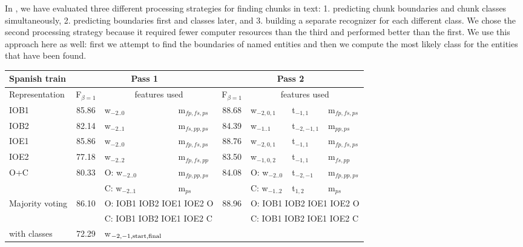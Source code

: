 \documentclass[11pt]{article}
\begin{document}
In \cite{tks2002jmlr}, we have evaluated three different processing
strategies for finding chunks in text: 1. predicting chunk boundaries
and chunk classes simultaneously, 2. predicting boundaries first and
classes later, and 3. building a separate recognizer for each
different class.
We chose the second processing strategy because it required fewer 
computer resources than the third and performed better than the first.
We use this approach here as well: first we attempt to find 
the boundaries of named entities and then we compute the most
likely class for the entities that have been found.

\begin{table*}[t]
\begin{center}
\begin{tabular}{|l|c|ll|c|lll|}\cline{2-8}
\multicolumn{1}{l|}{Spanish train} & \multicolumn{3}{c|}{Pass 1}  
                           & \multicolumn{4}{c|}{Pass 2} \\\hline
Representation& F$_{\beta=1}$ & \multicolumn{2}{c|}{features used} & 
       F$_{\beta=1}$ & \multicolumn{3}{c|}{features used} \\\hline
IOB1 & 85.86 & w$_{-2..0}$                    & m$_{fp,fs,ps}$ 
     & 88.68 & w$_{-2,0,1}$   & t$_{-1,1}$    & m$_{fp,fs,ps}$ \\
IOB2 & 82.14 & w$_{-2..1}$                    & m$_{fs,pp,ps}$
     & 84.39 & w$_{-1..1}$    & t$_{-2,-1,1}$ & m$_{pp,ps}$    \\
IOE1 & 85.86 & w$_{-2..0}$                    & m$_{fp,fs,ps}$
     & 88.76 & w$_{-2,0,1}$   & t$_{-1,1}$    & m$_{fp,fs,ps}$ \\
IOE2 & 77.18 & w$_{-2..2}$                    & m$_{fp,fs,pp}$
     & 83.50 & w$_{-1,0,2}$   & t$_{-1,1}$    & m$_{fs,pp}$    \\
O+C  & 80.33 & O: w$_{-2..0}$                 & m$_{fp,pp,ps}$             
     & 84.08 & O: w$_{-2..0}$ & t$_{-2,-1}$   & m$_{fp,pp,ps}$ \\
     &       & C: w$_{-2..1}$                 & m$_{ps}$
     &       & C: w$_{-1..2}$ & t$_{1,2}$     & m$_{ps}$       \\\hline
Majority voting & 86.10 & \multicolumn{2}{l|}{O: IOB1 IOB2 IOE1 IOE2 O}
                & 88.96 & \multicolumn{3}{l|}{O: IOB1 IOB2 IOE1 IOE2 O} \\
                &       & \multicolumn{2}{l|}{C: IOB1 IOB2 IOE1 IOE2 C}
                &       & \multicolumn{3}{l|}{C: IOB1 IOB2 IOE1 IOE2 C}\\\hline
with classes    & 72.29 & w$_{{\rm -2,-1,start,final}}$ & 

\end{tabular}
\end{center}
\end{table*}
\end{document}
